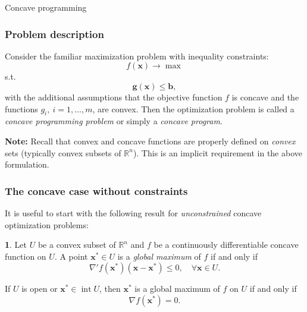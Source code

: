 \documentclass[10pt]{beamer}
\DeclareMathOperator*{\interior}{int}
\theoremstyle{definition}
\newtheorem{Fact}{\translate{Fact}}
\begin{document}
\begin{section}{Concave programming}\label{sec:concave}

\begin{frame}[fragile]
\frametitle{Problem description}
Consider the familiar maximization problem with inequality constraints:
\begin{equation}
f(\mathbf{x}) \rightarrow \max
\label{eq:objconc}
\end{equation}
s.t. \begin{equation}
\mathbf{g}(\mathbf{x})\leq \mathbf{b},
\label{eq:constrconc}
\end{equation}
with the additional assumptions that the objective function $ f $ is concave and the functions $ g_i, ~i=1,\ldots,m $, are convex. Then the optimization problem is called a \emph{concave programming problem} or simply a \emph{concave program}.\bigskip

\textbf{Note:} Recall that convex and concave functions are properly defined on \emph{convex} sets (typically convex subsets of $ \mathbb{R}^n $). This is an implicit requirement in the above formulation.
\end{frame}

\begin{frame}[fragile]
\frametitle{The concave case without constraints}
It is useful to start with the following result for \emph{unconstrained} concave optimization problems:
\begin{Fact}
Let $ U $ be a convex subset of $ \mathbb{R}^n $ and $ f $ be a continuously differentiable concave function on $ U $. A point $ \mathbf{x^*} \in U $ is a \emph{global maximum} of $ f $ if and only if \[ \nabla' f(\mathbf{x^*}) (\mathbf{x}-\mathbf{x^*}) \leq 0,\quad \forall \mathbf{x} \in U. \]

If $ U $ is open or $ \mathbf{x^*} \in \interior U$, then $ \mathbf{x^*} $ is a global maximum of $ f $ on $ U $ if and only if \[  \nabla f(\mathbf{x^*}) = 0. \]
\label{fc:ConcaveUnconstr}
\end{Fact}
\end{frame}


\end{section}
\end{document}
